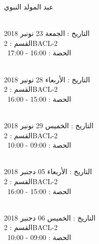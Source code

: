 \documentclass[14pt a4paper twocolumn]{book}
\begin{document}
\indent
  عيد المولد النبوي
\par
\noindent\makebox[\linewidth]{\rule{\paperwidth}{0.4pt}}
 \\
التاريخ : الجمعة 23 نونبر 2018 \\
القسم : 2BACL-2 \\
 \  
الحصة : 16:00 - 17:00 \\
\par
\noindent\makebox[\linewidth]{\rule{\paperwidth}{0.4pt}}
 \\
التاريخ : الأربعاء 28 نونبر 2018 \\
القسم : 2BACL-2 \\
 \  
الحصة : 15:00 - 16:00 \\
\par
\noindent\makebox[\linewidth]{\rule{\paperwidth}{0.4pt}}
 \\
التاريخ : الخميس 29 نونبر 2018 \\
القسم : 2BACL-2 \\
 \  
الحصة : 09:00 - 10:00 \\
\par
\noindent\makebox[\linewidth]{\rule{\paperwidth}{0.4pt}}
 \\
التاريخ : الأربعاء 05 دجنبر 2018 \\
القسم : 2BACL-2 \\
 \  
الحصة : 15:00 - 16:00 \\
\par
\noindent\makebox[\linewidth]{\rule{\paperwidth}{0.4pt}}
 \\
التاريخ : الخميس 06 دجنبر 2018 \\
القسم : 2BACL-2 \\
 \  
الحصة : 09:00 - 10:00 \\
\vfill
\end{document}
